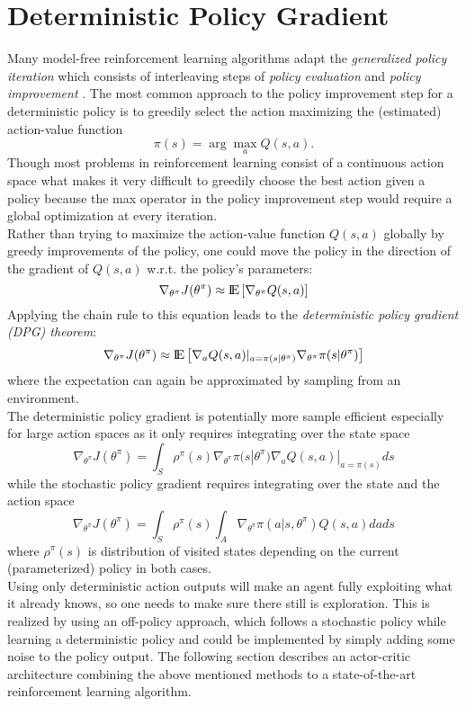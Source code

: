 \section{Deterministic Policy Gradient}
\label{sec:DPG}
Many model-free reinforcement learning algorithms adapt the \textit{generalized policy iteration} which consists of interleaving steps of \textit{policy evaluation} and \textit{policy improvement} \citep{sutton2018reinforcement}. The most common approach to the policy improvement step for a deterministic policy is to greedily select the action maximizing the (estimated) action-value function
\[
\pi(s) = \arg\max_a Q(s, a).
\]
Though most problems in reinforcement learning consist of a continuous action space what makes it very difficult to greedily choose the best action given a policy because the max operator in the policy improvement step would require a global optimization at every iteration.\\ 
Rather than trying to maximize the action-value function $Q(s,a)$ globally by greedy improvements of the policy, one could move the policy in the direction of the gradient of $Q(s,a)$ w.r.t. the policy's parameters:
\[
\nabla_{\theta^\pi}J(\theta^\pi)\approx {\rm I\!E}\left[\nabla_{\theta^\pi}Q(s,a)\right]
\]
Applying the chain rule to this equation leads to the \textit{deterministic policy gradient (DPG) theorem}:
\begin{align*}
\nabla_{\theta^\pi}J(\theta^\pi)\approx {\rm I\!E}\left[\nabla_aQ(s,a)|_{a=\pi(s|\theta^\pi)} \nabla_{\theta^\pi}\pi(s|\theta^\pi)\right]
\end{align*}
where the expectation can again be approximated by sampling from an environment.\\
The deterministic policy gradient is potentially more sample efficient especially for large action spaces as it only requires integrating over the state space
\[
\nabla_{\theta^\pi}J(\theta^\pi) = \int_{\mathit{S}}\rho^\pi(s) \nabla_{\theta^\pi}\pi(s|\theta^\pi)\nabla_a Q(s,a)|_{a=\pi(s)} ds
\]
while the stochastic policy gradient \citep{sutton2018reinforcement} requires integrating over the state and the action space
\[
\nabla_{\theta^\pi}J(\theta^\pi)=\int_{\mathit{S}}\rho^\pi(s)\int_{\mathit{A}}\nabla_{\theta^\pi}\pi(a|s,\theta^\pi)Q(s, a) da ds
\]
where $\rho^\pi(s)$ is distribution of visited states depending on the current (parameterized) policy in both cases.\\
Using only deterministic action outputs will make an agent fully exploiting what it already knows, so one needs to make sure there still is exploration. This is realized by using an off-policy approach, which follows a stochastic policy while learning a deterministic policy and could be implemented by simply adding some noise to the policy output. The following section describes an actor-critic architecture combining the above mentioned methods to a state-of-the-art reinforcement learning algorithm.


